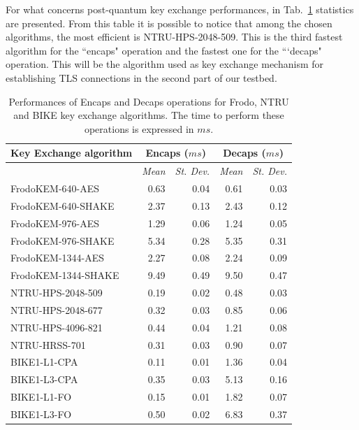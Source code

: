 \documentclass[a4paper,12pt]{article}
\def\mytab#1{Tab.~#1\xspace}
\begin{document}
For what concerns post-quantum key exchange performances, in \mytab{\ref{tab:results_kem_liboqs}} statistics are presented. From this table it is possible to notice that among the chosen algorithms, the most efficient is NTRU-HPS-2048-509. This is the third fastest algorithm for the ``encaps" operation and the fastest one for the ```decaps" operation. This will be the algorithm used as key exchange mechanism for establishing TLS connections in the second part of our testbed.


\begin{table}[]
\centering
\begin{tabular}{@{}lrrrr@{}}
\toprule
\textbf{Key Exchange algorithm} & \multicolumn{2}{c}{\textbf{Encaps ($ms$)}}         & \multicolumn{2}{c}{\textbf{Decaps ($ms$)}}                        \\ \midrule
                                & \multicolumn{1}{c}{\textit{Mean}} & \multicolumn{1}{c}{\textit{St. Dev.}} & \multicolumn{1}{c}{\textit{Mean}} & \multicolumn{1}{c}{\textit{St. Dev.}} \\ \hline
FrodoKEM-640-AES    & 0.63 & 0.04 & 0.61 & 0.03 \\
FrodoKEM-640-SHAKE  & 2.37 & 0.13 & 2.43 & 0.12 \\
FrodoKEM-976-AES    & 1.29 & 0.06 & 1.24 & 0.05 \\
FrodoKEM-976-SHAKE  & 5.34 & 0.28 & 5.35 & 0.31 \\
FrodoKEM-1344-AES   & 2.27 & 0.08 & 2.24 & 0.09 \\
FrodoKEM-1344-SHAKE & 9.49 & 0.49 & 9.50  & 0.47  \\ \hline
NTRU-HPS-2048-509 & 0.19 & 0.02 & 0.48 & 0.03 \\
NTRU-HPS-2048-677 & 0.32 & 0.03 & 0.85 & 0.06 \\
NTRU-HPS-4096-821 & 0.44 & 0.04 & 1.21 & 0.08 \\
NTRU-HRSS-701     & 0.31 & 0.03 & 0.90  & 0.07   \\ \hline
BIKE1-L1-CPA & 0.11 & 0.01 & 1.36 & 0.04 \\
BIKE1-L3-CPA & 0.35 & 0.03 & 5.13 & 0.16 \\
BIKE1-L1-FO  & 0.15 & 0.01 & 1.82 & 0.07 \\
BIKE1-L3-FO  & 0.50  & 0.02 & 6.83 & 0.37   \\ \bottomrule
\end{tabular}
\caption{Performances of Encaps and Decaps operations for Frodo, NTRU and BIKE key exchange algorithms. The time to perform these operations is expressed in $ms$.}
\label{tab:results_kem_liboqs}
\end{table}
\end{document}
